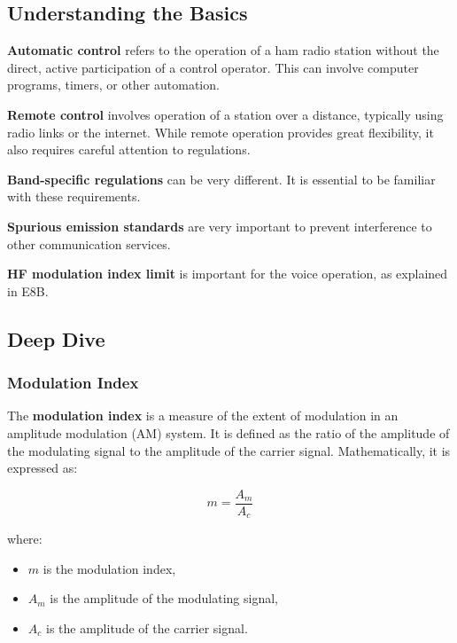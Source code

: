 \subsection*{Understanding the Basics}
  \textcolor{myblue}{\textbf{Automatic control}} refers to the operation of a ham radio station without the direct, active participation of a control operator. This can involve computer programs, timers, or other automation.
  \par
  \textcolor{myblue}{\textbf{Remote control}} involves operation of a station over a distance, typically using radio links or the internet. While remote operation provides great flexibility, it also requires careful attention to regulations.
  \par
  \textcolor{myblue}{\textbf{Band-specific regulations}} can be very different. It is essential to be familiar with these requirements.
   \par
  \textcolor{myblue}{\textbf{Spurious emission standards}} are very important to prevent interference to other communication services.
  \par
  \textcolor{myblue}{\textbf{HF modulation index limit}} is important for the voice operation, as explained in E8B.
  \par

  \subsection*{Deep Dive}
  
\subsubsection*{Modulation Index}

The \textbf{modulation index} is a measure of the extent of modulation in an amplitude modulation (AM) system. It is defined as the ratio of the amplitude of the modulating signal to the amplitude of the carrier signal. Mathematically, it is expressed as:

\begin{equation}
    m = \frac{A_m}{A_c}
\end{equation}

where:
\begin{itemize}
    \item $m$ is the modulation index,
    \item $A_m$ is the amplitude of the modulating signal,
    \item $A_c$ is the amplitude of the carrier signal.
\end{itemize}


